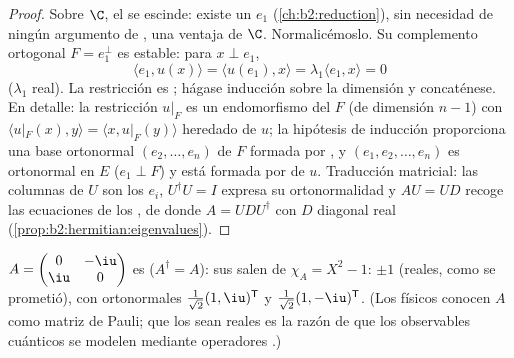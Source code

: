 \begin{proof}
Sobre $\C$, el  se escinde: existe un
 $e_1$ (\cref{ch:b2:reduction}), sin necesidad de ningún
argumento de , una ventaja de $\C$. Normalicémoslo. Su
complemento ortogonal $F = e_1^\perp$ es estable: para $x \perp e_1$,
\[
\langle e_1, u(x)\rangle = \langle u(e_1), x\rangle
= \lambda_1\langle e_1, x\rangle = 0
\]
($\lambda_1$ real). La restricción es ; hágase inducción
sobre la dimensión y concaténese. En detalle: la restricción $u|_F$
es un endomorfismo del  $F$ (de dimensión $n - 1$)
con $\langle u|_F(x), y\rangle = \langle x, u|_F(y)\rangle$ heredado
de $u$; la hipótesis de inducción proporciona una base ortonormal
$(e_2, \dots, e_n)$ de $F$ formada por , y $(e_1,
e_2, \dots, e_n)$ es ortonormal en $E$ ($e_1 \perp F$) y está
formada por  de $u$. Traducción matricial: las
columnas de $U$ son los $e_i$, $U^\dagger U = I$ expresa su
ortonormalidad y $AU = UD$ recoge las ecuaciones de los
, de donde $A = UDU^\dagger$ con $D$ diagonal real
(\cref{prop:b2:hermitian:eigenvalues}).
\end{proof}

\begin{example}\label{ex:b2:hermitian:pauli}
$A = \begin{pmatrix} 0 & -\iu\\ \iu & 0\end{pmatrix}$ es 
($A^\dagger = A$): sus  salen de $\chi_A = X^2 - 1$:
$\pm 1$ (reales, como se prometió), con 
ortonormales $\frac{1}{\sqrt2}(1, \iu)^{\mathsf T}$ y
$\frac{1}{\sqrt2}(1, -\iu)^{\mathsf T}$. (Los físicos conocen $A$
como matriz de Pauli; que los   sean reales es la
razón de que los observables cuánticos se modelen mediante operadores
.)
\end{example}

